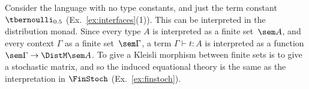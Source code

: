 Consider the language with no type constants, and just the term constant $\tbernoulli_{0.5}$ (Ex.~\ref{ex:interfaces}(1)).
This can be interpreted in the distribution monad.
Since every type $A$ is interpreted as a finite set~$\sem A$, and every context $\Gamma$ as a finite set~$\sem\Gamma$,
a term $\Gamma \vdash t:A$ is interpreted as a function $\sem \Gamma\to \DistM\sem A$.
To give a Kleisli morphism between finite sets is to give a stochastic matrix, and so the induced equational theory is the same as
the interpretation in $\FinStoch$ (Ex.~\ref{ex:finstoch}). 
